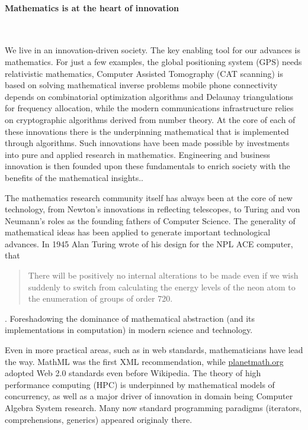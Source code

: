\paragraph{Mathematics is at the heart of innovation}\ 


We live in an innovation-driven society. The key enabling tool for our
advances is mathematics. For just a few examples, the global
positioning system (GPS) needs relativistic mathematics,
Computer Assisted Tomography (CAT scanning) is based on solving
mathematical inverse problems
mobile phone connectivity depends on combinatorial optimization
algorithms and Delaunay triangulations for frequency allocation,
while the modern
communications infrastructure relies on cryptographic algorithms
derived from number theory. At the core of each of these innovations
there is the underpinning mathematical that is implemented through
algorithms. Such innovations have been made possible by investments
into pure and applied research in mathematics. Engineering and
business innovation is then founded upon these fundamentals to enrich
society with the benefits of the mathematical insights..


The mathematics research community itself has always been at the core of new
technology, from Newton's innovations in reflecting telescopes, to
Turing and von Neumann's roles as the founding fathers of Computer
Science. The generality of mathematical ideas has been applied to
generate important technological advances.  In 1945 Alan Turing wrote
of his design for the NPL ACE computer, that
\begin{quote}
  There will be positively no internal alterations to be
  made even if we wish suddenly to switch from calculating the energy
  levels of the neon atom to the enumeration of groups of order
  720.
\end{quote}.  
Foreshadowing the dominance of mathematical abstraction (and its
implementations in computation) in modern science and technology.

Even in more practical areas, such as in web standards, mathematicians
have lead the way. MathML was the first XML recommendation, while
\url{planetmath.org} adopted Web 2.0 standards even before
Wikipedia. The theory of high performance computing (HPC) is underpinned by mathematical models of concurrency, as well as a major driver of innovation in domain being Computer Algebra System research. Many now standard
programming paradigms (iterators, comprehensions, generics) appeared originaly there.


